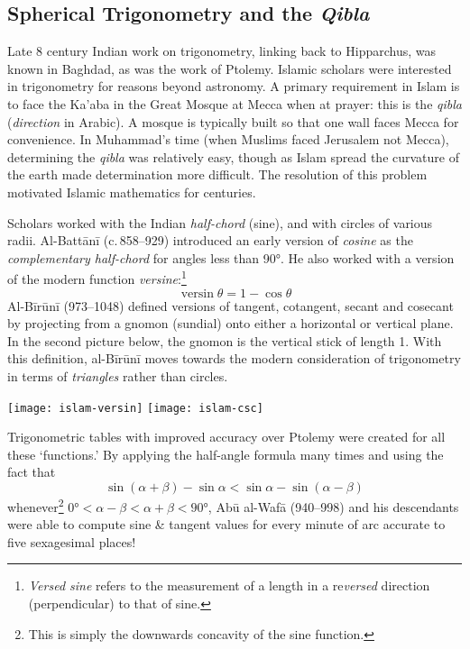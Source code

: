 \subsection{Spherical Trigonometry and the \emph{Qibla}}

Late 8\th{} century Indian work on trigonometry, linking back to Hipparchus, was known in Baghdad, as was the work of Ptolemy. Islamic scholars were interested in trigonometry for reasons beyond astronomy. A primary requirement in Islam is to face the Ka'aba in the Great Mosque at Mecca when at prayer: this is the \emph{qibla} (\emph{direction} in Arabic). A mosque is typically built so that one wall faces Mecca for convenience. In Muhammad's time (when Muslims faced Jerusalem not Mecca), determining the \emph{qibla} was relatively easy, though as Islam spread the curvature of the earth made determination more difficult. The resolution of this problem motivated Islamic mathematics for centuries.




Scholars worked with the Indian \emph{half-chord} (sine), and with circles of various radii. Al-Battānī (c.\,858--929) introduced an early version of \emph{cosine} as the \emph{complementary half-chord} for angles less than \ang{90}. He also worked with a version of the modern function \emph{versine}:\footnote{\emph{Versed sine} refers to the measurement of a length in a re\emph{versed} direction (perpendicular) to that of sine.}
\[\operatorname{versin}\theta=1-\cos\theta\]
Al-Bīrūnī (973--1048) defined versions of tangent, cotangent, secant and cosecant by projecting from a gnomon (sundial) onto either a horizontal or vertical plane. In the second picture below, the gnomon is the vertical stick of length 1. With this definition, al-Bīrūnī moves towards the modern consideration of trigonometry in terms of \emph{triangles} rather than circles.
  \begin{center}
  \texttt{[image: islam-versin]}\qquad\qquad
  \texttt{[image: islam-csc]}
  \end{center}\label{pg:sineconcave}

Trigonometric tables with improved accuracy over Ptolemy were created for all these `functions.' By applying the half-angle formula many times and using the fact that
\[\sin(\alpha+\beta)-\sin\alpha<\sin\alpha-\sin(\alpha-\beta)\]
whenever\footnote{This is simply the downwards concavity of the sine function.} $\ang{0}<\alpha-\beta<\alpha+\beta<\ang{90}$, Abū al-Wafā (940--998) and his descendants were able to compute sine \& tangent values for every minute of arc accurate to five sexagesimal places!
\goodbreak


